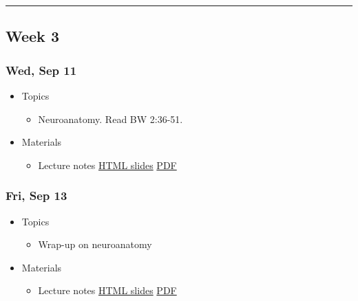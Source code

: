 \documentclass[]{article}
\providecommand{\tightlist}{%
  \setlength{\itemsep}{0pt}\setlength{\parskip}{0pt}}
\begin{document}
\begin{center}\rule{0.5\linewidth}{\linethickness}\end{center}

\hypertarget{week-3}{%
\subsection{Week 3}\label{week-3}}

\hypertarget{wed-sep-11}{%
\subsubsection{Wed, Sep 11}\label{wed-sep-11}}

\begin{itemize}
\tightlist
\item
  Topics

  \begin{itemize}
  \tightlist
  \item
    Neuroanatomy. Read BW 2:36-51.
  \end{itemize}
\item
  Materials

  \begin{itemize}
  \tightlist
  \item
    Lecture notes \textbar{} \href{}{HTML slides} \textbar{}
    \href{}{PDF}
  \end{itemize}
\end{itemize}

\hypertarget{fri-sep-13}{%
\subsubsection{Fri, Sep 13}\label{fri-sep-13}}

\begin{itemize}
\tightlist
\item
  Topics

  \begin{itemize}
  \tightlist
  \item
    Wrap-up on neuroanatomy
  \end{itemize}
\item
  Materials

  \begin{itemize}
  \tightlist
  \item
    Lecture notes \textbar{} \href{}{HTML slides} \textbar{}
    \href{}{PDF}
  \end{itemize}
\end{itemize}
\end{document}
